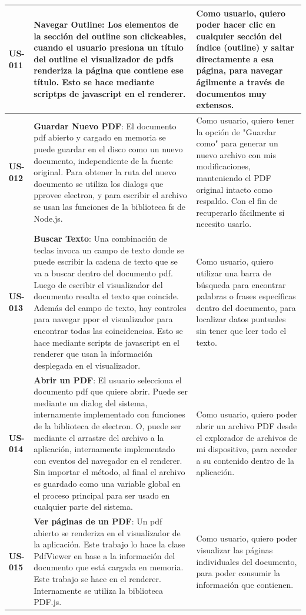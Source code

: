 \begin{longtable}{|l||p{7cm}|p{4.5cm}|}
\hline
\hline
\textbf{US-011} & \textbf{Navegar Outline}: Los elementos de la sección del outline son clickeables, cuando el usuario presiona un título del outline el visualizador de pdfs renderiza la página que contiene ese título. Esto se hace mediante scriptps de javascript en el renderer. & Como usuario, quiero poder hacer clic en cualquier sección del índice (outline) y saltar directamente a esa página, para navegar ágilmente a través de documentos muy extensos.\\
\hline
\hline
\textbf{US-012} & \textbf{Guardar Nuevo PDF}:  El documento pdf abierto y cargado en memoria se puede guardar en el disco como un nuevo documento, independiente de la fuente original. Para obtener la ruta del nuevo documento se utiliza los dialogs que pprovee electron, y para escribir el archivo se usan las funciones de la biblioteca fs de Node.js. & Como usuario, quiero tener la opción de "Guardar como" para generar un nuevo archivo con mis modificaciones, manteniendo el PDF original intacto como respaldo. Con el fin de recuperarlo fácilmente si necesito usarlo. \\
\hline
\hline
\textbf{US-013} & \textbf{Buscar Texto}: Una combinación de teclas invoca un campo de texto donde se puede escribir la cadena de texto que se va a buscar dentro del documento pdf. Luego de escribir el visualizador del documento resalta el texto que coincide. Además del campo de texto, hay controles para navegar ppor el visualizador para encontrar todas las coincidencias. Esto se hace mediante scripts de javascript en el renderer que usan la información desplegada en el visualizador. & Como usuario, quiero utilizar una barra de búsqueda para encontrar palabras o frases específicas dentro del documento, para localizar datos puntuales sin tener que leer todo el texto.\\
\hline
\hline
\textbf{US-014} & \textbf{Abrir un PDF}:  El usuario selecciona el documento pdf que quiere abrir. Puede ser mediante un dialog del sistema, internamente implementado con funciones de la biblioteca de electron. O, puede ser mediante el arrastre del archivo a la aplicación, internamente implementado con eventos del navegador en el renderer. Sin importar el método, al final el archivo es guardado como una variable global en el proceso principal para ser usado en cualquier parte del sistema. & Como usuario, quiero poder abrir un archivo PDF desde el explorador de archivos de mi dispositivo, para acceder a su contenido dentro de la aplicación.\\
\hline
\hline
\textbf{US-015} & \textbf{Ver páginas de un PDF}:  Un pdf abierto se renderiza en el visualizador de la aplicación. Este trabajo lo hace la clase PdfViewer en base a la información del documento que está cargada en memoria. Este trabajo se hace en el renderer. Internamente se utiliza la biblioteca PDF.js. & Como usuario, quiero poder visualizar las páginas individuales del documento, para poder consumir la información que contienen.\\

\end{longtable}
